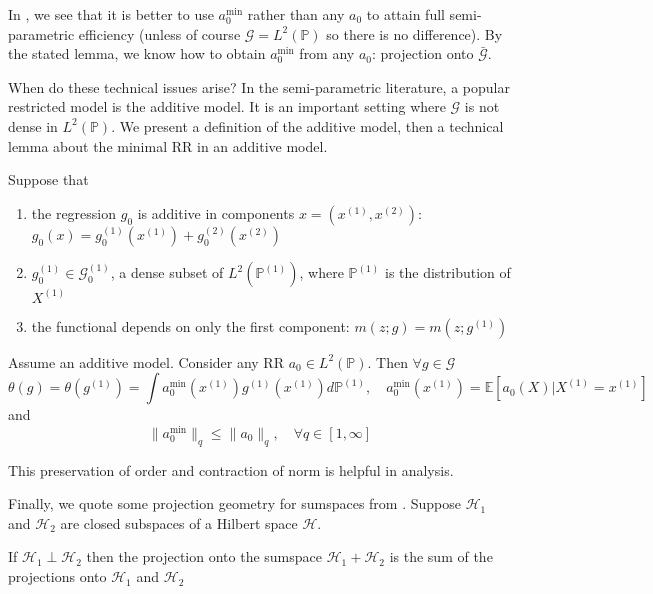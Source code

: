 In \cite[Theorem 2]{chernozhukov2018global}, we see that it is better to use $a_0^{\min}$ rather than any $a_0$ to attain full semi-parametric efficiency (unless of course $\mathcal{G}=L^2(\mathbb{P})$ so there is no difference). By the stated lemma, we know how to obtain $a_0^{\min}$ from any $a_0$: projection onto $\bar{\mathcal{G}}$.

When do these technical issues arise? In the semi-parametric literature, a popular restricted model is the additive model. It is an important setting where $\mathcal{G}$ is not dense in $L^2(\mathbb{P})$. We present a definition of the additive model, then a technical lemma about the minimal RR in an additive model.

\begin{definition}
Suppose that 
\begin{enumerate}
    \item the regression $g_0$ is additive in components $x=(x^{(1)},x^{(2)})$:
$
g_0(x)=g^{(1)}_0(x^{(1)})+g^{(2)}_0(x^{(2)})
$
    \item $g_0^{(1)} \in \mathcal{G}_0^{(1)}$, a dense subset of $L^2(\mathbb{P}^{(1)})$, where $\mathbb{P}^{(1)}$ is the distribution of $X^{(1)}$
    \item the functional depends on only the first component: $m(z;g)=m(z;g^{(1)})$
\end{enumerate}

\end{definition}

\begin{lemma}
Assume an additive model. Consider any RR $a_0\in L^2(\mathbb{P})$. Then $\forall g\in\mathcal{G}$
$$
\theta(g)=\theta(g^{(1)})=\int a_0^{\min}(x^{(1)})g^{(1)}(x^{(1)})d\mathbb{P}^{(1)},\quad a_0^{\min}(x^{(1)})=\mathbb{E}[a_0(X)|X^{(1)}=x^{(1)}]
$$
and
$$
\|a_0^{\min}\|_q\leq \|a_0\|_q,\quad\forall q\in[1,\infty]
$$
\end{lemma}
This preservation of order and contraction of norm is helpful in analysis.

Finally, we quote some projection geometry for sumspaces from \cite[Appendix A.4]{bickel1993efficient}. Suppose $\mathcal{H}_1$ and $\mathcal{H}_2$ are closed subspaces of a Hilbert space $\mathcal{H}$. 

\begin{lemma}
If $\mathcal{H}_1 \perp \mathcal{H}_2$ then the projection onto the sumspace $\mathcal{H}_1 + \mathcal{H}_2$ is the sum of the projections onto $\mathcal{H}_1$ and $\mathcal{H}_2$
\end{lemma}

